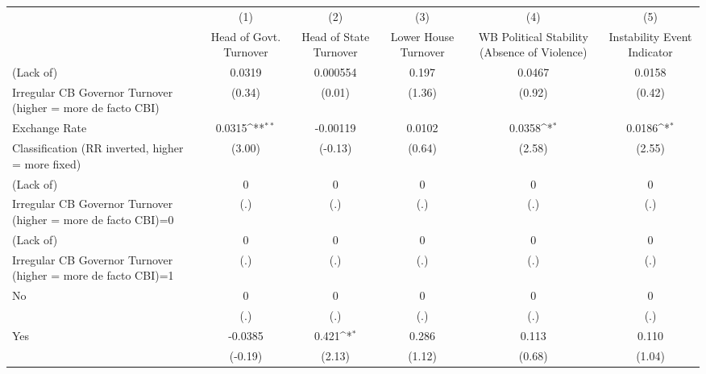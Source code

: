 {
\def\sym#1{\ifmmode^{#1}\else\(^{#1}\)\fi}
\begin{tabular}{l*{5}{c}}
\toprule
                &\multicolumn{1}{c}{(1)}&\multicolumn{1}{c}{(2)}&\multicolumn{1}{c}{(3)}&\multicolumn{1}{c}{(4)}&\multicolumn{1}{c}{(5)}\\
                &\multicolumn{1}{c}{Head of Govt. Turnover}&\multicolumn{1}{c}{Head of State Turnover}&\multicolumn{1}{c}{Lower House Turnover}&\multicolumn{1}{c}{WB Political Stability (Absence of Violence)}&\multicolumn{1}{c}{Instability Event Indicator}\\
\midrule
(Lack of)       &   0.0319         & 0.000554         &    0.197         &   0.0467         &   0.0158         \\
Irregular CB Governor Turnover (higher = more de facto CBI)&   (0.34)         &   (0.01)         &   (1.36)         &   (0.92)         &   (0.42)         \\
\addlinespace
Exchange Rate   &   0.0315\sym{**} & -0.00119         &   0.0102         &   0.0358\sym{*}  &   0.0186\sym{*}  \\
Classification (RR inverted, higher = more fixed)&   (3.00)         &  (-0.13)         &   (0.64)         &   (2.58)         &   (2.55)         \\
\addlinespace
(Lack of)       &        0         &        0         &        0         &        0         &        0         \\
Irregular CB Governor Turnover (higher = more de facto CBI)=0&      (.)         &      (.)         &      (.)         &      (.)         &      (.)         \\
\addlinespace
(Lack of)       &        0         &        0         &        0         &        0         &        0         \\
Irregular CB Governor Turnover (higher = more de facto CBI)=1&      (.)         &      (.)         &      (.)         &      (.)         &      (.)         \\
\addlinespace
No              &        0         &        0         &        0         &        0         &        0         \\
                &      (.)         &      (.)         &      (.)         &      (.)         &      (.)         \\
\addlinespace
Yes             &  -0.0385         &    0.421\sym{*}  &    0.286         &    0.113         &    0.110         \\
                &  (-0.19)         &   (2.13)         &   (1.12)         &   (0.68)         &   (1.04)         \\

\end{tabular}}
